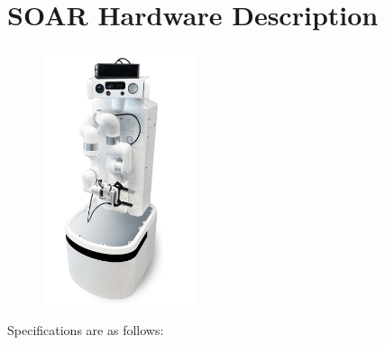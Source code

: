 
\section*{SOAR Hardware Description}%
\label{sec:annex-OPL}

\setlength\intextsep{0pt}
\begin{figure}
	\centering
	\includegraphics[width=0.4\textwidth]{images/soar.png}
\end{figure}

Specifications are as follows:

